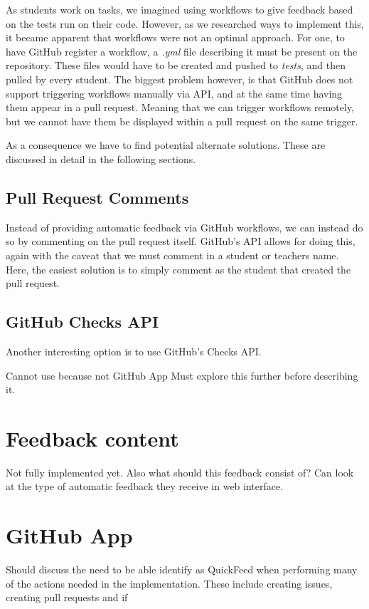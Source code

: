 As students work on tasks, we imagined using workflows to give feedback based on the tests run on their code.
However, as we researched ways to implement this, it became apparent that workflows were not an optimal approach.
For one, to have GitHub register a workflow, a \textit{.yml} file describing it must be present on the repository.
These files would have to be created and pushed to \textit{tests}, and then pulled by every student.
The biggest problem however, is that GitHub does not support triggering workflows manually via API, and at the same time having them appear in a pull request.
Meaning that we can trigger workflows remotely, but we cannot have them be displayed within a pull request on the same trigger.

As a consequence we have to find potential alternate solutions.
These are discussed in detail in the following sections.

\subsection{Pull Request Comments}

Instead of providing automatic feedback via GitHub workflows, we can instead do so by commenting on the pull request itself.
GitHub's API allows for doing this, again with the caveat that we must comment in a student or teachers name.
Here, the easiest solution is to simply comment as the student that created the pull request.

\subsection{GitHub Checks API}

Another interesting option is to use GitHub's Checks API.

Cannot use because not GitHub App
Must explore this further before describing it.

\section{Feedback content}

Not fully implemented yet.
Also what should this feedback consist of? Can look at the type of automatic feedback they receive in web interface.

\section{GitHub App}

Should discuss the need to be able identify as QuickFeed when performing many of the actions needed in the implementation.
These include creating issues, creating pull requests and if 